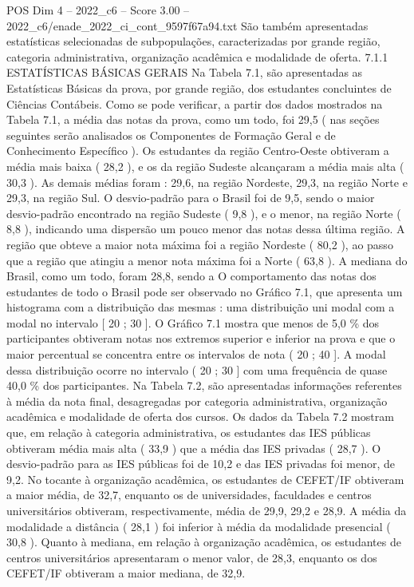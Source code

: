 \begin{textsample}{POS Dim 4 – 2022\_c6 – Score 3.00 – 2022\_c6/enade\_2022\_ci\_cont\_9597f67a94.txt}
São também apresentadas estatísticas selecionadas de subpopulações, caracterizadas por grande região, categoria administrativa, organização acadêmica e modalidade de oferta. 7.1.1 ESTATÍSTICAS BÁSICAS GERAIS Na Tabela 7.1, são apresentadas as Estatísticas Básicas da prova, por grande região, dos estudantes concluintes de Ciências Contábeis.
Como se pode verificar, a partir dos dados mostrados na Tabela 7.1, a média das notas da prova, como um todo, foi 29,5 ( nas seções seguintes serão analisados os Componentes de Formação Geral e de Conhecimento Específico ).
Os estudantes da região Centro-Oeste obtiveram a média mais baixa ( 28,2 ), e os da região Sudeste alcançaram a média mais alta ( 30,3 ).
As demais médias foram : 29,6, na região Nordeste, 29,3, na região Norte e 29,3, na região Sul.
O desvio-padrão para o Brasil foi de 9,5, sendo o maior desvio-padrão encontrado na região Sudeste ( 9,8 ), e o menor, na região Norte ( 8,8 ), indicando uma dispersão um pouco menor das notas dessa última região.
A região que obteve a maior nota máxima foi a região Nordeste ( 80,2 ), ao passo que a região que atingiu a menor nota máxima foi a Norte ( 63,8 ).
A mediana do Brasil, como um todo, foram 28,8, sendo a O comportamento das notas dos estudantes de todo o Brasil pode ser observado no Gráfico 7.1, que apresenta um histograma com a distribuição das mesmas : uma distribuição uni modal com a modal no intervalo [ 20 ; 30 ].
O Gráfico 7.1 mostra que menos de 5,0 \% dos participantes obtiveram notas nos extremos superior e inferior na prova e que o maior percentual se concentra entre os intervalos de nota ( 20 ; 40 ].
A modal dessa distribuição ocorre no intervalo ( 20 ; 30 ] com uma frequência de quase 40,0 \% dos participantes.
Na Tabela 7.2, são apresentadas informações referentes à média da nota final, desagregadas por categoria administrativa, organização acadêmica e modalidade de oferta dos cursos.
Os dados da Tabela 7.2 mostram que, em relação à categoria administrativa, os estudantes das IES públicas obtiveram média mais alta ( 33,9 ) que a média das IES privadas ( 28,7 ).
O desvio-padrão para as IES públicas foi de 10,2 e das IES privadas foi menor, de 9,2.
No tocante à organização acadêmica, os estudantes de CEFET/IF obtiveram a maior média, de 32,7, enquanto os de universidades, faculdades e centros universitários obtiveram, respectivamente, média de 29,9, 29,2 e 28,9.
A média da modalidade a distância ( 28,1 ) foi inferior à média da modalidade presencial ( 30,8 ).
Quanto à mediana, em relação à organização acadêmica, os estudantes de centros universitários apresentaram o menor valor, de 28,3, enquanto os dos CEFET/IF obtiveram a maior mediana, de 32,9.

\end{textsample}
